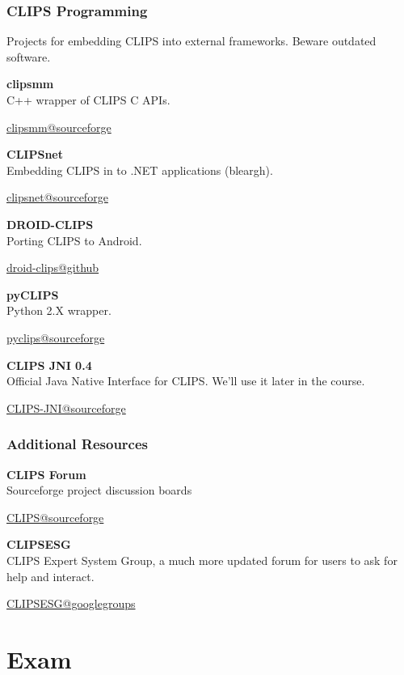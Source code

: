 \documentclass[xcolor={usenames,dvipsnames,svgnames}, compress]{beamer}
\begin{document}
\begin{frame}
  \frametitle{CLIPS Programming}
  Projects for embedding CLIPS into external
  frameworks. Beware outdated software.\par\bigskip
  
  \textbf{clipsmm}\\
  C++ wrapper of CLIPS C APIs.
  \begin{flushright}
    \vspace{-20pt}
    \href{http://clipsmm.sourceforge.net/}{clipsmm@sourceforge}
  \end{flushright}
  \textbf{CLIPSnet}\\
  Embedding CLIPS in to .NET applications (bleargh).
  \begin{flushright}
    \vspace{-20pt}
    \href{http://sourceforge.net/projects/clipsnet/}{clipsnet@sourceforge}
  \end{flushright}
  \textbf{DROID-CLIPS}\\
  Porting CLIPS to Android.
  \begin{flushright}
    \vspace{-20pt}
    \href{https://github.com/DrItanium/DROID-CLIPS}{droid-clips@github}
  \end{flushright}
  \textbf{pyCLIPS}\\
  Python 2.X wrapper.
  \begin{flushright}
    \vspace{-20pt}
    \href{http://pyclips.sourceforge.net/web/}{pyclips@sourceforge}
  \end{flushright}
  \textbf{CLIPS JNI 0.4}\\
  Official Java Native Interface for CLIPS. We'll use it later in the course.
  \begin{flushright}
    \vspace{-5pt}
    \href{http://clipsrules.sourceforge.net/CLIPSJNIBeta.html}{CLIPS-JNI@sourceforge}
  \end{flushright}
\end{frame}

\begin{frame}
  \frametitle{Additional Resources}

  \textbf{CLIPS Forum}\\
  Sourceforge project discussion boards
  \begin{flushright}
    \vspace{-5pt}
    \href{http://sourceforge.net/p/clipsrules/discussion/}{CLIPS@sourceforge}
  \end{flushright}

  
  \textbf{CLIPSESG}\\
  CLIPS Expert System Group, a much more updated forum for users to
  ask for help and interact.
  \begin{flushright}
    \vspace{-5pt}
    \href{https://groups.google.com/forum/\#!forum/CLIPSESG}{CLIPSESG@googlegroups}
  \end{flushright}
  
\end{frame}

\section{Exam}
{
  \begin{frame}
    \sectionpage
  \end{frame}
}
\end{document}

